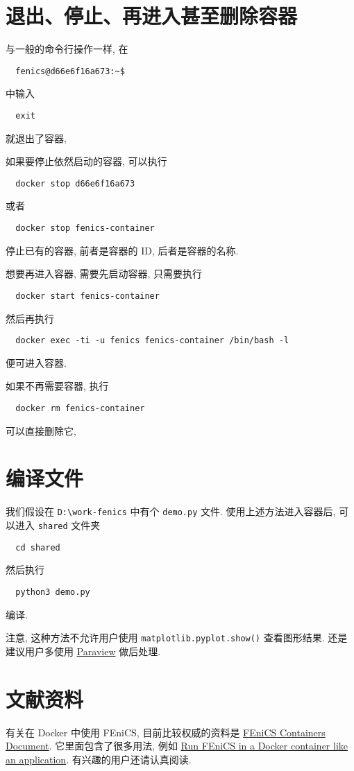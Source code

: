 \documentclass[fontset=founder]{ctexrep}
\begin{document}
\section{退出、停止、再进入甚至删除容器}

与一般的命令行操作一样,
在
\begin{lstlisting}
  fenics@d66e6f16a673:~$
\end{lstlisting}
中输入
\begin{lstlisting}
  exit
\end{lstlisting}
就退出了容器,

如果要停止依然启动的容器,
可以执行
\begin{lstlisting}
  docker stop d66e6f16a673
\end{lstlisting}
或者
\begin{lstlisting}
  docker stop fenics-container
\end{lstlisting}
停止已有的容器,
前者是容器的 ID,
后者是容器的名称.

想要再进入容器,
需要先启动容器,
只需要执行
\begin{lstlisting}
  docker start fenics-container
\end{lstlisting}
然后再执行
\begin{lstlisting}
  docker exec -ti -u fenics fenics-container /bin/bash -l
\end{lstlisting}
便可进入容器.

如果不再需要容器,
执行
\begin{lstlisting}
  docker rm fenics-container
\end{lstlisting}
可以直接删除它,

\section{编译文件}

我们假设在 \texttt{D:\textbackslash work-fenics} 中有个 \texttt{demo.py} 文件.
使用上述方法进入容器后,
可以进入 \texttt{shared} 文件夹
\begin{lstlisting}
  cd shared
\end{lstlisting}
然后执行
\begin{lstlisting}
  python3 demo.py
\end{lstlisting}
编译.

注意,
这种方法不允许用户使用 \texttt{matplotlib.pyplot.show()} 查看图形结果.
还是建议用户多使用 \href{https://www.paraview.org/}{Paraview} 做后处理.

\section{文献资料}

有关在 Docker 中使用 FEniCS,
目前比较权威的资料是 \href{https://fenics.readthedocs.io/projects/containers/en/latest/index.html}{FEniCS Containers Document}.
它里面包含了很多用法,
例如 \href{https://fenics.readthedocs.io/projects/containers/en/latest/work_flows.html#run-fenics-in-a-docker-container-like-an-application}{Run FEniCS in a Docker container like an application}.
有兴趣的用户还请认真阅读.
\end{document}
